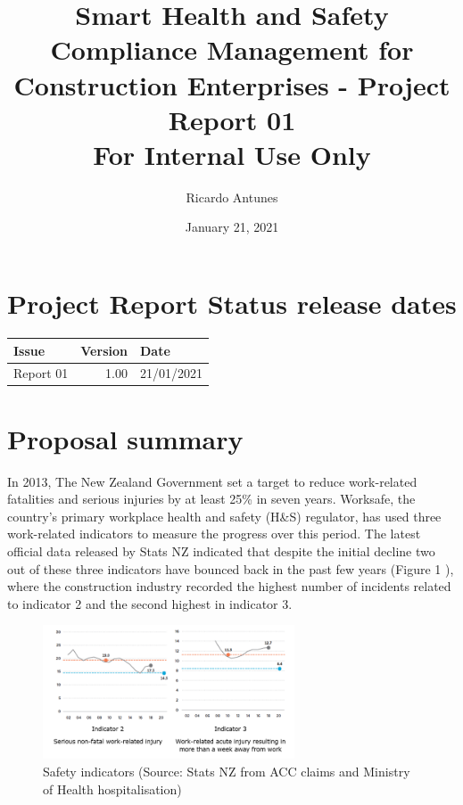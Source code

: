 \documentclass{article}
\author{Ricardo Antunes}
\date{January 21, 2021}
\title{Smart Health and Safety Compliance Management for Construction Enterprises - Project Report 01\\\medskip
\large For Internal Use Only}
\begin{document}
\maketitle
\tableofcontents


\section{Project Report Status release dates}
\label{sec:org76690ab}
\begin{center}
\begin{tabular}{lrl}
Issue & Version & Date\\
\hline
Report 01 & 1.00 & 21/01/2021\\
\end{tabular}
\end{center}
\section{Proposal summary}
\label{sec:orgca8b77c}

In 2013, The New Zealand Government set a target to reduce work-related fatalities and serious injuries by at least 25\% in seven years. 
Worksafe, the country's primary workplace health and safety (H\&S) regulator, has used three work-related indicators to measure the progress over this period. 
The latest official data released by Stats NZ indicated that despite the initial decline two out of these three indicators have bounced back in the past few years (Figure 1 \label{org397b92c}), where the construction industry recorded the highest number of incidents related to indicator 2 and the second highest in indicator 3.  

\begin{figure}[htbp]
\centering
\includegraphics[height=150]{./Images/fig_01.png}
\caption{\label{fig:orgf490c35}Safety indicators (Source: Stats NZ from ACC claims and Ministry of Health hospitalisation)}
\end{figure}
\end{document}
